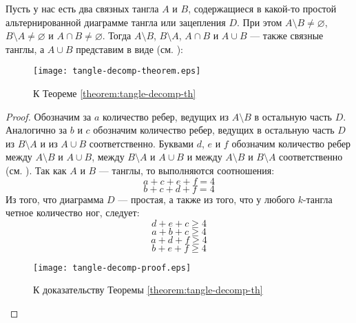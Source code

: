 		\begin{theorem}
			\label{theorem:tangle-decomp-th}
			Пусть у нас есть два связных тангла $A$ и $B$, содержащиеся в какой-то простой альтернированной диаграмме
			тангла или зацепления $D$. При этом $A\setminus B\neq\varnothing$, $B\setminus A\neq\varnothing$
			и $A\cap B\neq\varnothing$. Тогда $A\setminus B$, $B\setminus A$, $A\cap B$ и $A\cup B$ --- также связные
			танглы, а $A\cup B$ представим в виде (см. ):

			\begin{figure}[H]
				\centering
				\texttt{[image: tangle-decomp-theorem.eps]}
				\caption{К Теореме \ref{theorem:tangle-decomp-th}\label{figure:tangle-decomp}}
			\end{figure}
		\end{theorem}
		\begin{proof}
			Обозначим за $a$ количество ребер, ведущих из $A\setminus B$ в остальную часть $D$. Аналогично за $b$ и $c$
			обозначим количество ребер, ведущих в остальную часть $D$ из $B\setminus A$ и из $A\cup B$ соответственно.
			Буквами $d$, $e$ и $f$ обозначим количество ребер между $A\setminus B$ и $A\cup B$, между $B\setminus A$ и
			$A\cup B$ и между $A\setminus B$ и $B\setminus A$ соответственно (см. ).
			Так как $A$ и $B$ --- танглы, то выполняются соотношения:
			\begin{equation}
				\label{equation:a_relation}
				a + c + e + f = 4
			\end{equation}
			\begin{equation}
				\label{equation:b_relation}
				b + c + d + f = 4
			\end{equation}
			Из того, что диаграмма $D$ --- простая, а также из того, что у любого $k$-тангла четное количество ног, следует:
			\begin{equation}
				\label{equation:ab_relation}
				d + e + c \ge 4
			\end{equation}
			\begin{equation}
				\label{equation:all_relation}
				a + b + c \ge 4
			\end{equation}
			\begin{equation}
				\label{equation:amb_relation}
				a + d + f \ge 4
			\end{equation}
			\begin{equation}
				\label{equation:bma_relation}
				b + e + f \ge 4
			\end{equation}
			\begin{figure}[H]
				\centering
				\texttt{[image: tangle-decomp-proof.eps]}
				\caption{К доказательству Теоремы \ref{theorem:tangle-decomp-th}\label{figure:tangle-decomp-proof}}
			\end{figure}


\end{proof}
